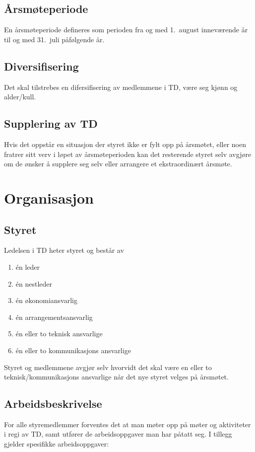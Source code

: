 \documentclass[11pt]{article}
\begin{document}
\subsection{Årsmøteperiode}
En årsmøteperiode defineres som perioden fra og med 1.\ august inneværende år til og med 31.\ juli påfølgende år.

\subsection{Diversifisering}
Det skal tilstrebes en difersifisering av medlemmene i TD, være seg kjønn og alder/kull.

\subsection{Supplering av TD}
Hvis det oppstår en situasjon der styret ikke er fylt opp på årsmøtet, eller noen fratrer sitt verv i løpet av årsmøteperioden kan det resterende styret selv avgjøre om de ønsker å supplere seg selv eller arrangere et ekstraordinært årsmøte.

\section{Organisasjon}
\subsection{Styret}
Ledelsen i TD heter styret og består av
\begin{enumerate}
	\item én leder
	\item én nestleder
	\item én økonomiansvarlig
	\item én arrangementsansvarlig
	\item én eller to teknisk ansvarlige
	\item én eller to kommunikasjons ansvarlige 
\end{enumerate}

Styret og medlemmene avgjør selv hvorvidt det skal være en eller to teknisk/kommunikasjons ansvarlige når det nye styret velges på årsmøtet.

\subsection{Arbeidsbeskrivelse}
For alle styremedlemmer forventes det at man møter opp på møter og aktiviteter i regi av TD, samt utfører de arbeidsoppgaver man har påtatt seg. I tillegg gjelder spesifikke arbeidsoppgaver:
\end{document}
